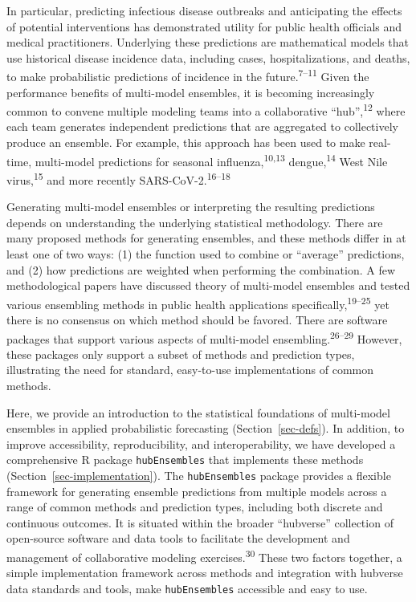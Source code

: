\documentclass[
]{article}
\begin{document}
In particular, predicting infectious disease outbreaks and anticipating
the effects of potential interventions has demonstrated utility for
public health officials and medical practitioners. Underlying these
predictions are mathematical models that use historical disease
incidence data, including cases, hospitalizations, and deaths, to make
probabilistic predictions of incidence in the
future.\textsuperscript{7--11} Given the performance benefits of
multi-model ensembles, it is becoming increasingly common to convene
multiple modeling teams into a collaborative
``hub'',\textsuperscript{12} where each team generates independent
predictions that are aggregated to collectively produce an ensemble. For
example, this approach has been used to make real-time, multi-model
predictions for seasonal influenza,\textsuperscript{10,13}
dengue,\textsuperscript{14} West Nile virus,\textsuperscript{15} and
more recently SARS-CoV-2.\textsuperscript{16--18}

Generating multi-model ensembles or interpreting the resulting
predictions depends on understanding the underlying statistical
methodology. There are many proposed methods for generating ensembles,
and these methods differ in at least one of two ways: (1) the function
used to combine or ``average'' predictions, and (2) how predictions are
weighted when performing the combination. A few methodological papers
have discussed theory of multi-model ensembles and tested various
ensembling methods in public health applications
specifically,\textsuperscript{19--25} yet there is no consensus on which
method should be favored. There are software packages that support
various aspects of multi-model ensembling.\textsuperscript{26--29}
However, these packages only support a subset of methods and prediction
types, illustrating the need for standard, easy-to-use implementations
of common methods.

Here, we provide an introduction to the statistical foundations of
multi-model ensembles in applied probabilistic forecasting
(Section~\ref{sec-defs}). In addition, to improve accessibility,
reproducibility, and interoperability, we have developed a comprehensive
R package \texttt{hubEnsembles} that implements these methods
(Section~\ref{sec-implementation}). The \texttt{hubEnsembles} package
provides a flexible framework for generating ensemble predictions from
multiple models across a range of common methods and prediction types,
including both discrete and continuous outcomes. It is situated within
the broader ``hubverse'' collection of open-source software and data
tools to facilitate the development and management of collaborative
modeling exercises.\textsuperscript{30} These two factors together, a
simple implementation framework across methods and integration with
hubverse data standards and tools, make \texttt{hubEnsembles} accessible
and easy to use.
\end{document}
